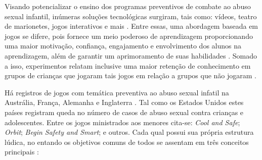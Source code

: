 Visando potencializar o ensino dos programas preventivos de combate ao abuso sexual infantil, inúmeras soluções tecnológicas surgiram, tais como: vídeos, teatro de marionetes, jogos interativos e mais \cite{muller2014child, davis2000child}. Entre essas, uma abordagem baseada em jogos se difere, pois fornece um meio poderoso de aprendizagem proporcionando uma maior motivação, confiança, engajamento e envolvimento dos alunos na aprendizagem, além de garantir um aprimoramento de suas habilidades \cite{dip2016advancing}. Somado a isso, experimentos relatam inclusive uma maior retenção de conhecimento em grupos de crianças que jogaram tais jogos em relação a grupos que não jogaram \cite{muller2014child, fingerleabschlussbericht}. 

Há registros de jogos com temática preventiva ao abuso sexual infatil na Austrália, França, Alemanha e Inglaterra \cite{millman2019uk}. Tal como os Estados Unidos estes países registram queda no número de casos de abuso sexual contra crianças e adolescentes. Entre os jogos ministrados aos menores cita-se: \textit{Cool and Safe}; \textit{Orbit}; \textit{Begin Safety and Smart}; e outros. Cada qual possui sua própria estrutura lúdica, no entando os objetivos comuns de todos se assentam em três conceitos principais \cite{maria2010papel}:  


\begin{parcolumns}{3}


\end{parcolumns}

